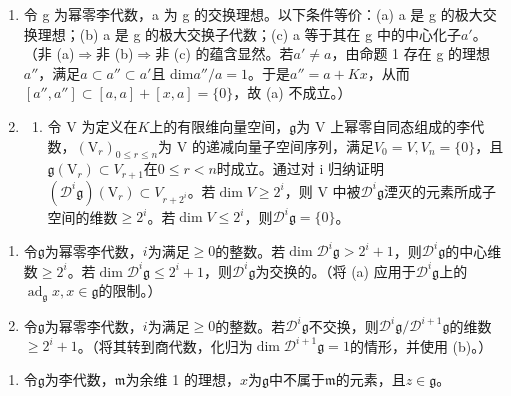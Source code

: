 \begin{enumerate}
\def\labelenumi{\arabic{enumi}.}
\setcounter{enumi}{5}
\item
  令 g 为幂零李代数，a 为 g 的交换理想。以下条件等价：(a) a 是 g 的极大交换理想；(b) a 是 g 的极大交换子代数；(c) a 等于其在 g 中的中心化子\(a'\)。（非 (a)\(\Rightarrow\)非 (b)\(\Rightarrow\)非 (c) 的蕴含显然。若\(a' \neq a\)，由命题 1 存在 g 的理想\(a''\)，满足\(a \subset a'' \subset a'\)且 dim\(a''/a = 1\)。于是\(a'' = a + Kx\)，从而\([a'', a''] \subset [a, a] + [x, a] = \{0\}\)，故 (a) 不成立。）
\item
  \begin{enumerate}
  \def\labelenumii{(\alph{enumii})}
  \tightlist
  \item
    令 V 为定义在\(K\)上的有限维向量空间，\(\mathfrak{g}\)为 V 上幂零自同态组成的李代数，\((\mathrm{V}_{r})_{0 \leq r \leq n}\)为 V 的递减向量子空间序列，满足\(V_{0} = V, V_{n} = \{0\}\)，且\(\mathfrak{g}(\mathrm{V}_{r}) \subset V_{r+1}\)在\(0 \leq r < n\)时成立。通过对 i 归纳证明\((\mathcal{D}^{i}\mathfrak{g})(\mathrm{V}_{r}) \subset V_{r+2^{i}}\)。若\(\dim V \geq 2^{i}\)，则 V 中被\(\mathcal{D}^{i}\mathfrak{g}\)湮灭的元素所成子空间的维数\(\geqslant 2^{i}\)。若\(\dim V \leqslant 2^{i}\)，则\(\mathcal{D}^{i}\mathfrak{g} = \{0\}\)。
  \end{enumerate}
\end{enumerate}

\begin{enumerate}
\def\labelenumi{(\alph{enumi})}
\setcounter{enumi}{1}
\item
  令\(\mathfrak{g}\)为幂零李代数，\(i\)为满足\(\geqslant 0\)的整数。若\(\dim \mathcal{D}^{i}\mathfrak{g} > 2^{i} + 1\)，则\(\mathcal{D}^{i}\mathfrak{g}\)的中心维数\(\geqslant 2^{i}\)。若\(\dim \mathcal{D}^{i}\mathfrak{g} \leqslant 2^{i} + 1\)，则\(\mathcal{D}^{i}\mathfrak{g}\)为交换的。（将 (a) 应用于\(\mathcal{D}^{i}\mathfrak{g}\)上的\(\operatorname{ad}_{\mathfrak{g}} x, x \in \mathfrak{g}\)的限制。）
\item
  令\(\mathfrak{g}\)为幂零李代数，\(i\)为满足\(\geqslant 0\)的整数。若\(\mathcal{D}^{i}\mathfrak{g}\)不交换，则\(\mathcal{D}^{i}\mathfrak{g}/\mathcal{D}^{i+1}\mathfrak{g}\)的维数\(\geqslant 2^{i} + 1\)。（将其转到商代数，化归为\(\dim \mathcal{D}^{i+1}\mathfrak{g} = 1\)的情形，并使用 (b)。）
\end{enumerate}

\begin{enumerate}
\def\labelenumi{\arabic{enumi}.}
\setcounter{enumi}{7}
\tightlist
\item
  令\(\mathfrak{g}\)为李代数，\(\mathfrak{m}\)为余维 1 的理想，\(x\)为\(\mathfrak{g}\)中不属于\(\mathfrak{m}\)的元素，且\(z \in \mathfrak{g}\)。
\end{enumerate}

